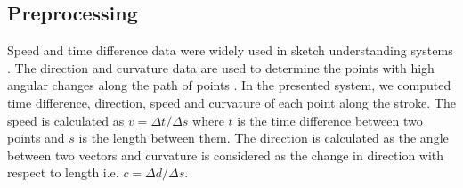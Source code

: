 \documentclass{article}%
\begin{document}
%	
\subsection{Preprocessing}
\label{Prepross}
 Speed and time difference data were widely used in sketch understanding systems \cite{earlyprocess}. The direction and curvature data are used to determine the points with high angular changes along the path of points \cite{meanshift10}.  
 In the presented system, we computed time difference, direction, speed and curvature of each point along the stroke. The speed is calculated as  $v=\Delta t/\Delta s$ where $t$ is the time difference between two points and $s$ is the length between them. The direction is calculated as the angle between two vectors and curvature is considered as the change in direction with respect to length i.e. $c= \Delta d/\Delta s$.
 
\end{document}

